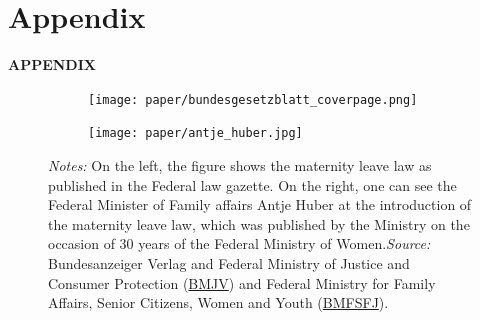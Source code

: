 \documentclass[11pt, a4paper,draft]{article} %
\begin{document}
\newpage
\TODO\section{Appendix}
\vspace*{\fill}
{\Huge \begin{center}\textbf{APPENDIX}\end{center}}
\vspace*{\fill}\clearpage


\renewcommand\thefigure{A\arabic{figure}}
\setcounter{figure}{0} 
\captionsetup[subfigure]{labelformat=parens}
\vspace*{\fill}
\begin{figure}[H]\centering
	\caption{Introduction of the maternity leave law}\label{fig: bundesgesetzblatt_antjehuber}
	\begin{subfigure}[h]{0.48\linewidth}\centering%
		\texttt{[image: paper/bundesgesetzblatt\_coverpage.png]}
	\end{subfigure}
	\begin{subfigure}[h]{0.48\linewidth}\centering%
		\texttt{[image: paper/antje\_huber.jpg]}
	\end{subfigure}
	\begin{minipage}{\linewidth}
		\scriptsize{\emph{Notes:} On the left, the figure shows the maternity leave law as published in the Federal law gazette. On the right, one can see the Federal Minister of Family affairs Antje Huber at the introduction of the maternity leave law, which was published by the Ministry on the occasion of 30 years of the Federal Ministry of Women.\newline \emph{Source:} Bundesanzeiger Verlag and Federal Ministry of Justice and Consumer Protection (\hyperlink{http://www.bgbl.de/xaver/bgbl/start.xav?startbk=Bundesanzeiger_BGBl&jumpTo=bgbl179s0797.pdf}{BMJV}) and Federal Ministry for Family Affairs, Senior Citizens, Women and Youth (\hyperlink{https://twitter.com/bmfsfj/status/745513281989677058}{BMFSFJ}).}
	\end{minipage}
\end{figure}
\vspace*{\fill}\clearpage
\end{document}
